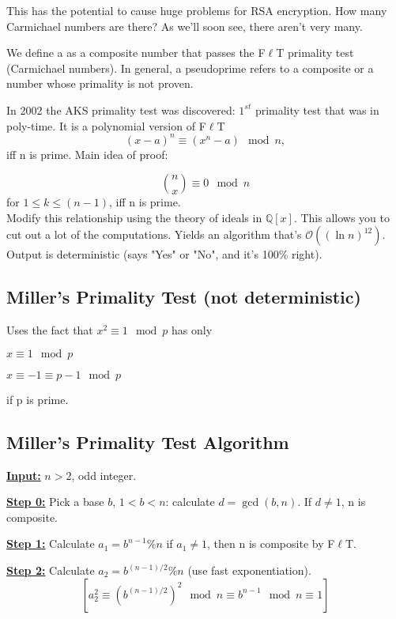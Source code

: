 This has the potential to cause huge problems for RSA encryption. How many Carmichael numbers are there? As we'll soon see, there aren't very many. 

\begin{definition} We define a  as a composite number that passes the F$\ell$T primality test (Carmichael numbers). In general, a pseudoprime refers to a composite or a number whose primality is not proven.

In 2002 the AKS primality test was discovered: $1^{st}$ primality test that was in poly-time. It is a polynomial version of F$\ell$T
$$(x - a)^{n} \equiv (x^{n} - a) \mod n,$$
iff n is prime. Main idea of proof:

$$ {n \choose x} \equiv  0  \mod n$$
for $1 \leq k \leq (n-1)$, iff n is prime.
\\

Modify this relationship using the theory of ideals in $\mathbb{Q}[x]$. This allows you to cut out a lot of the computations. Yields an algorithm that's 
$\mathcal{O}((\ln{n})^{12})$. Output is deterministic (says "Yes" or "No", and it's 100\% right).

\subsection{Miller's Primality Test (not deterministic)}
Uses the fact that $x^{2} \equiv 1 \mod p$ has only 

$x \equiv 1 \mod p$ 

$x \equiv -1 \equiv p-1 \mod p$ 

\noindent if p is prime.

\subsection{Miller's Primality Test Algorithm}

\textbf{\underline{Input:}} $n > 2$, odd integer.


\noindent \textbf{\underline{Step 0:}} Pick a base $b$, $1 < b < n$: calculate $d = \gcd(b, n)$.
If $d \ne 1$, n is composite. 


\noindent \textbf{\underline{Step 1:}} Calculate $a_{1} = b^{n - 1} \% n $ if $a_{1} \ne 1$, then n is composite by F$\ell$T.


\noindent \textbf{\underline{Step 2:}} Calculate $a_{2} = b^{(n-1)/2} \% n$ (use fast exponentiation).
$$[a_{2}^{2} \equiv (b^{(n-1)/2})^2 \mod n \equiv b^{n-1} \mod n \equiv 1]$$


\end{definition}
